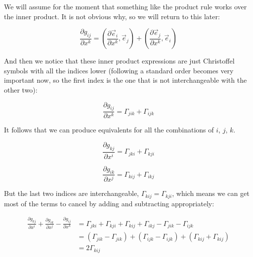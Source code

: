 We will assume for the moment that something like the product rule works over the inner product. It is not obvious why, so we will return to this later:

\begin{equation}
\frac{\partial g_{ij}}{\partial x^k} 
=
\left(
\frac{\partial \vec{e}_i}{\partial x^k}
,\vec{e}_j
 \right)
+
\left(
\frac{\partial \vec{e}_j}{\partial x^k}
,\vec{e}_i
 \right)
\end{equation}

And then we notice that these inner product expressions are just Christoffel symbols with all the indices lower (following a standard order becomes very important now, so the first index is the one that is not interchangeable with the other two):

\begin{equation}
\frac{\partial g_{ij}}{\partial x^k} 
=
\Gamma_{jik}+\Gamma_{ijk}
\end{equation}

It follows that we can produce equivalents for all the combinations of $i$, $j$, $k$.

\begin{equation}
\frac{\partial g_{kj}}{\partial x^i} 
=
\Gamma_{jki}+\Gamma_{kji}
\end{equation}

\begin{equation}
\frac{\partial g_{ik}}{\partial x^j} 
=
\Gamma_{kij}+\Gamma_{ikj}
\end{equation}

But the last two indices are interchangeable, $\Gamma_{kij} = \Gamma_{kji}$, which means we can get most of the terms to cancel by adding and subtracting appropriately:

\begin{equation}
    \begin{split}
        \frac{\partial g_{kj}}{\partial x^i} 
        +
        \frac{\partial g_{ik}}{\partial x^j} 
        -
        \frac{\partial g_{ij}}{\partial x^k}
        &=
        \Gamma_{jki}+\Gamma_{kji}
        +
        \Gamma_{kij}+\Gamma_{ikj}
        -
        \Gamma_{jik}-\Gamma_{ijk} \\
        &=        
        (\Gamma_{jik}-\Gamma_{jik})
        +
        (\Gamma_{ijk}-\Gamma_{ijk})
        +
        (\Gamma_{kij}+\Gamma_{kij}) \\
        &= 2\Gamma_{kij}       
    \end{split}
\end{equation}


